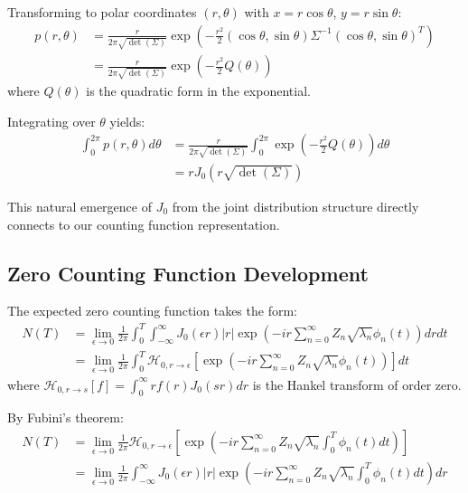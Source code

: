 \documentclass{article}
\begin{document}
Transforming to polar coordinates $(r,\theta)$ with $x = r\cos\theta$, $y = r\sin\theta$:
\begin{equation}
\begin{split}
    p(r,\theta) &= \frac{r}{2\pi\sqrt{\det(\Sigma)}} \exp\left(-\frac{r^2}{2}(\cos\theta,\sin\theta)\Sigma^{-1}(\cos\theta,\sin\theta)^T\right) \\
    &= \frac{r}{2\pi\sqrt{\det(\Sigma)}} \exp\left(-\frac{r^2}{2}Q(\theta)\right)
\end{split}
\end{equation}
where $Q(\theta)$ is the quadratic form in the exponential.

Integrating over $\theta$ yields:
\begin{equation}
\begin{split}
    \int_0^{2\pi} p(r,\theta) d\theta &= \frac{r}{2\pi\sqrt{\det(\Sigma)}} \int_0^{2\pi} \exp\left(-\frac{r^2}{2}Q(\theta)\right) d\theta \\
    &= rJ_0(r\sqrt{\det(\Sigma)})
\end{split}
\end{equation}

This natural emergence of $J_0$ from the joint distribution structure directly connects to our counting function representation.

\subsection{Zero Counting Function Development}
The expected zero counting function takes the form:
\begin{equation}
\begin{split}
    N(T) &= \lim_{\epsilon \to 0} \frac{1}{2\pi} \int_0^T \int_{-\infty}^{\infty} J_0(\epsilon r)|r| \exp\left(-ir\sum_{n=0}^{\infty} Z_n \sqrt{\lambda_n} \phi_n(t)\right) dr dt \\
    &= \lim_{\epsilon \to 0} \frac{1}{2\pi} \int_0^T \mathcal{H}_{0,r\to\epsilon}\left[\exp\left(-ir\sum_{n=0}^{\infty} Z_n \sqrt{\lambda_n} \phi_n(t)\right)\right] dt
\end{split}
\end{equation}
where $\mathcal{H}_{0,r\to s}[f] = \int_0^\infty rf(r)J_0(sr)dr$ is the Hankel transform of order zero.

By Fubini's theorem:
\begin{equation}
\begin{split}
    N(T) &= \lim_{\epsilon \to 0} \frac{1}{2\pi} \mathcal{H}_{0,r\to\epsilon}\left[\exp\left(-ir\sum_{n=0}^{\infty} Z_n \sqrt{\lambda_n} \int_0^T \phi_n(t) dt\right)\right] \\
    &= \lim_{\epsilon \to 0} \frac{1}{2\pi} \int_{-\infty}^{\infty} J_0(\epsilon r)|r| \exp\left(-ir\sum_{n=0}^{\infty} Z_n \sqrt{\lambda_n} \int_0^T \phi_n(t) dt\right) dr
\end{split}
\end{equation}
\end{document}

